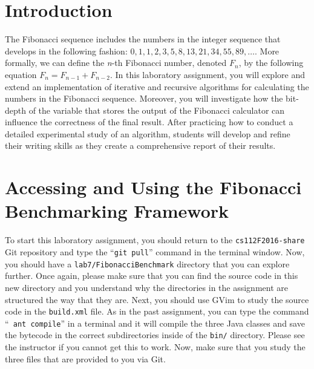 

\usepackage[compact]{titlesec}


\section*{Introduction}

The Fibonacci sequence includes the numbers in the integer sequence that develops in the following fashion: $0, 1, 1,
2, 3, 5, 8, 13, 21, 34, 55, 89, \ldots$. More formally, we can define the {\em n}-th Fibonacci number, denoted $F_n$,
by the following equation $F_n = F_{n-1} + F_{n-2}$. In this laboratory assignment, you will explore and
extend an implementation of iterative and recursive algorithms for calculating the numbers in the Fibonacci sequence.
Moreover, you will investigate how the bit-depth of the variable that stores the output of the Fibonacci calculator can
influence the correctness of the final result. After practicing how to conduct a detailed experimental study of an
algorithm, students will develop and refine their writing skills as they create a comprehensive report of their results.

\section*{Accessing and Using the Fibonacci Benchmarking Framework}

\begin{sloppypar}

  To start this laboratory assignment, you should return to the {\tt cs112F2016-share} Git repository and type the
  ``{\tt git pull}'' command in the terminal window.  Now, you should have a {\tt lab7/FibonacciBenchmark} directory
  that you can explore further.  Once again, please make sure that you can find the source code in this new directory
  and you understand why the directories in the assignment are structured the way that they are. Next, you should use
  GVim to study the source code in the {\tt build.xml} file.  As in the past assignment, you can type the command ``{\tt
  ant compile}'' in a terminal and it will compile the three Java classes and save the bytecode in the correct
  subdirectories inside of the {\tt bin/} directory. Please see the instructor if you cannot get this to work.  Now,
  make sure that you study the three files that are provided to you via Git.

\end{sloppypar}

